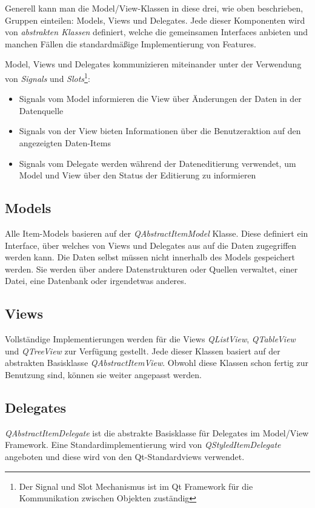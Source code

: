 \documentclass[11pt,a4paper,titlepage]{scrreprt}
\begin{document}
Generell kann man die Model/View-Klassen in diese drei, wie oben beschrieben, Gruppen
einteilen: Models, Views und Delegates. Jede dieser Komponenten wird von {\itshape abstrakten
Klassen} definiert, welche die gemeinsamen Interfaces anbieten und manchen Fällen die
standardmäßige Implementierung von Features.

Model, Views und Delegates kommunizieren miteinander unter der Verwendung von 
{\itshape Signals} und {\itshape Slots}\footnote{Der Signal und Slot Mechanismus 
ist im Qt Framework für die Kommunikation zwischen Objekten zuständig}:
\begin{itemize}
\item Signals vom Model informieren die View über Änderungen der Daten in der Datenquelle
\item Signals von der View bieten Informationen über die Benutzeraktion auf den angezeigten
Daten-Items
\item Signals vom Delegate werden während der Dateneditierung verwendet, um Model und
View über den Status der Editierung zu informieren
\end{itemize}

\subsection{Models}
Alle Item-Models basieren auf der {\itshape QAbstractItemModel} Klasse. Diese definiert ein
Interface, über welches von Views und Delegates aus auf die Daten zugegriffen werden kann.
Die Daten selbst müssen nicht innerhalb des Models gespeichert werden. Sie werden über andere
Datenstrukturen oder Quellen verwaltet, einer Datei, eine Datenbank oder irgendetwas anderes.

\subsection{Views}
Vollständige Implementierungen werden für die Views {\itshape QListView}, {\itshape QTableView} und
{\itshape QTreeView} zur Verfügung gestellt. Jede dieser Klassen basiert auf der abstrakten
Basisklasse {\itshape QAbstractItemView}. Obwohl diese Klassen schon fertig zur Benutzung sind,
können sie weiter angepasst werden.

\subsection{Delegates}
{\itshape QAbstractItemDelegate} ist die abstrakte Basisklasse für Delegates im Model/View
Framework. Eine Standardimplementierung wird von {\itshape QStyledItemDelegate} angeboten und
diese wird von den Qt-Standardviews verwendet.
\end{document}
